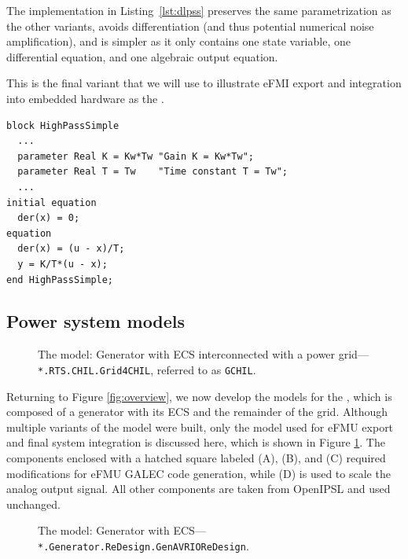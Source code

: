 The implementation in Listing~\ref{lst:dlpss} preserves the same parametrization as the other variants, avoids differentiation (and thus potential numerical noise amplification), and is simpler as it only contains one state variable, one differential equation, and one algebraic output equation.

This is the final variant that we will use to illustrate eFMI export and integration into embedded hardware as the \controller{}.

\begin{lstlisting}[language = modelica,
caption={\texttt{HighPassSimple} component used in the PSS of Figure \ref{fig:pssvariants}~(D).},label={lst:dlpss}]
block HighPassSimple
  ...
  parameter Real K = Kw*Tw "Gain K = Kw*Tw";
  parameter Real T = Tw    "Time constant T = Tw";
  ...
initial equation 
  der(x) = 0;
equation 
  der(x) = (u - x)/T;
  y = K/T*(u - x);
end HighPassSimple;
\end{lstlisting}

\subsection{Power system models}\label{sec:power-system-models}

\begin{figure}[t!]
    \centerline{}
    \caption{The \plant{} model: Generator with ECS interconnected with a power grid---\texttt{*.RTS.CHIL.Grid4CHIL}, referred to as \texttt{GCHIL}.}
    \vspace{-2ex}
    \label{fig:g4chil}
\end{figure}

Returning to Figure \ref{fig:overview}, we now develop the models for the \plant{}, which is composed of a generator with its ECS and the remainder of the grid. Although multiple \plant{} variants of the model were built, only the model used for eFMU export and final system integration is discussed here, which is shown in Figure \ref{fig:g4chil}. The components enclosed with a hatched square labeled (A), (B), and (C) required modifications for eFMU GALEC code generation, while (D) is used to scale the analog output signal. All other components are taken from OpenIPSL and used unchanged.

\begin{figure}[b!]
    \centerline{}
    \vspace{-2ex}
    \caption{The \generatorunit{} model: Generator with ECS---\texttt{*.Generator.ReDesign.GenAVRIOReDesign}.}
    \vspace{-2ex}
    \label{fig:genunit}
\end{figure}

